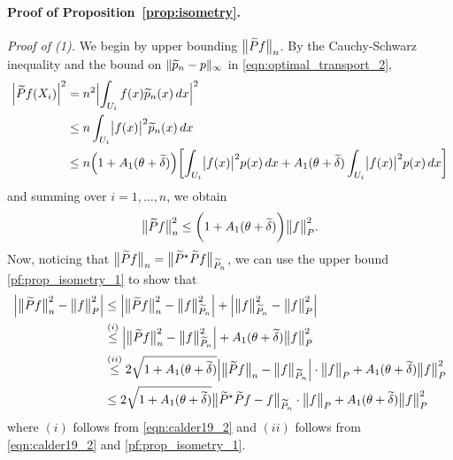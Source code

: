 \paragraph{Proof of Proposition~\ref{prop:isometry}.}
\textit{Proof of (1).}
We begin by upper bounding $\bigl\|\widetilde{P}f\bigr\|_{n}$. By the Cauchy-Schwarz inequality and the bound on $\|\widetilde{p}_n - p\|_{\infty}$ in \eqref{eqn:optimal_transport_2},
\begin{align*}
\Bigl|\widetilde{P}f(X_i)\Bigr|^2 & = n^2 \Bigl|\int_{U_i} f(x) \widetilde{p}_n(x) \,dx\Bigr|^2 \\
& \leq n \int_{U_i} \bigl|f(x)\bigr|^2 \widetilde{p}_n(x) \,dx \\
& \leq n \Bigl(1 + A_1(\theta + \widetilde{\delta})\Bigr)\biggl[\int_{U_i} \bigl|f(x)\bigr|^2 p(x) \,dx + A_1(\theta + \widetilde{\delta}) \int_{U_i} \bigl|f(x)\bigr|^2 p(x) \,dx\biggr]
\end{align*}
and summing over $i = 1,\ldots,n$, we obtain
\begin{equation}
\label{pf:prop_isometry_1}
\bigl\|\widetilde{P}f\bigr\|_{n}^2 \leq \biggl(1 + A_1(\theta + \widetilde{\delta})\biggr) \bigl\|f\bigr\|_{P}^2.
\end{equation}
Now, noticing that $\bigl\|\widetilde{P}f\bigr\|_{n} = \bigl\|\widetilde{P}^{\star}\widetilde{P}f\bigr\|_{\widetilde{P}_n}$, we can use the upper bound \eqref{pf:prop_isometry_1} to show that
\begin{align}
\Bigl|\bigl\|\widetilde{P}f\bigr\|_{n}^2 - \bigl\|f\bigr\|_{P}^2\Bigr| & \leq \Bigl|\bigl\|\widetilde{P}f\bigr\|_{n}^2 - \bigl\|f\bigr\|_{\widetilde{P}_n}^2\Bigr| + \Bigl|\bigl\|f\bigr\|_{\widetilde{P}_n}^2 - \bigl\|f\bigr\|_{P}^2\Bigr| \nonumber \\
& \overset{(i)}{\leq} \Bigl|\bigl\|\widetilde{P}f\bigr\|_{n}^2 - \bigl\|f\bigr\|_{\widetilde{P}_n}^2\Bigr|  + A_1(\theta + \widetilde{\delta}) \bigl\|f\bigr\|_{P}^2 \\
& \overset{(ii)}{\leq} 2 \sqrt{1 + A_1(\theta + \widetilde{\delta})} \Bigl|\bigl\|\widetilde{P}f\bigr\|_{n} - \bigl\|f\bigr\|_{\widetilde{P}_n}\Bigr| \cdot \bigl\|f\bigr\|_{P} + A_1(\theta + \widetilde{\delta}) \bigl\|f\bigr\|_{P}^2 \nonumber \\
& \leq 2 \sqrt{1 + A_1(\theta + \widetilde{\delta})} \bigl\|\widetilde{P}^{\star}\widetilde{P}f - f\bigr\|_{\widetilde{P}_n} \cdot \bigl\|f\bigr\|_{P} + A_1(\theta + \widetilde{\delta}) \bigl\|f\bigr\|_{P}^2 \label{pf:prop_isometry_2}
\end{align}
where $(i)$ follows from \eqref{eqn:calder19_2} and $(ii)$ follows from \eqref{eqn:calder19_2} and  \eqref{pf:prop_isometry_1}. 

